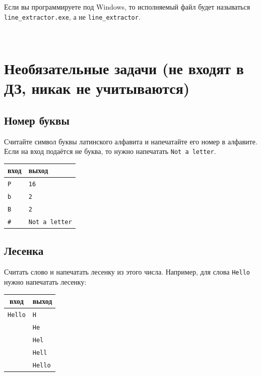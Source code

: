 \documentclass{article}
\begin{document}
\noindent Если вы программируете под Windows, то исполняемый файл будет называться \texttt{line\_extractor.exe}, а не \texttt{line\_extractor}.



\newpage
~
\newpage
\section*{Необязательные задачи (не входят в ДЗ, никак не учитываются)}
\setcounter{subsection}{0}

\subsection{Номер буквы}
Считайте символ буквы латинского алфавита и напечатайте его номер в алфавите. Если на вход подаётся не буква, то нужно напечатать \texttt{Not a letter}.
\begin{center}
\begin{tabular}{ l | l }
 вход & выход \\ \hline
 \texttt{P} & \texttt{16} \\
 \texttt{b} & \texttt{2} \\
 \texttt{B} & \texttt{2} \\
 \texttt{\#} & \texttt{Not a letter}\\ 
\end{tabular}
\end{center}

\subsection{Лесенка}
Считать слово и напечатать лесенку из этого числа. Например, для слова \texttt{Hello} нужно напечатать лесенку: 
\begin{center}
\begin{center}
\begin{tabular}{ c | l }
 вход & выход \\ \hline
 \texttt{Hello} & \texttt{H}  \\ 
 & \texttt{He} \\
 & \texttt{Hel} \\
 & \texttt{Hell} \\
 & \texttt{Hello}\\ 
\end{tabular}
\end{center}
\end{center}
\end{document}
